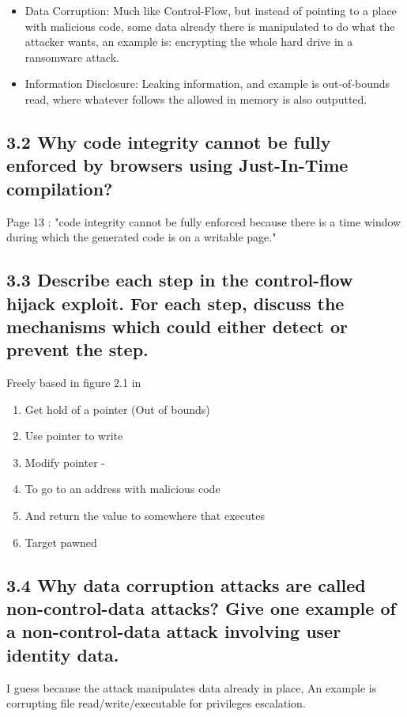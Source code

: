 \documentclass[
	letterpaper, %
	10pt, %
	unnumberedsections, %
	twoside, %
]{LTJournalArticle}
\begin{document}
\begin{itemize}
\begin{itemize}
	\item Data Corruption: Much like Control-Flow, but instead of pointing to a place with malicious code, some data already there is manipulated to do what the attacker wants, an example is: encrypting the whole hard drive in a ransomware attack.       
\end{itemize}

\begin{itemize}
	\item Information Disclosure: Leaking information, and example is out-of-bounds read, where whatever follows the allowed in memory is also outputted.       
\end{itemize}


\subsection{3.2 Why code integrity cannot be fully enforced by browsers using Just-In-Time compilation?}
Page 13 \cite{MemDissertation}: "code integrity cannot be fully enforced because there is a time window during which the generated code is on a writable page."


\subsection{3.3 Describe each step in the control-flow hijack exploit. For each step, discuss the mechanisms which could either detect or prevent the step.}
Freely based in figure 2.1 in \cite{MemDissertation}
\begin{enumerate}
	\item Get hold of a pointer (Out of bounds)
	\item Use pointer to write
	\item Modify pointer -
	\item To go to an address with malicious code
	\item And return the value to somewhere that executes
	\item Target pawned
\end{enumerate}

\subsection{3.4 Why data corruption attacks are called non-control-data attacks? Give one example of a non-control-data attack involving user identity data.}
I guess because the attack manipulates data already in place, An example is corrupting file read/write/executable for privileges escalation.

\end{itemize}
\end{document}
